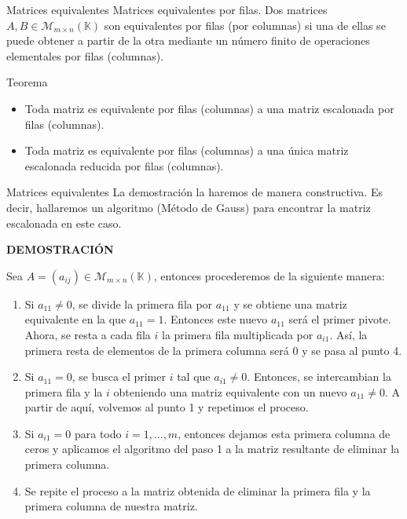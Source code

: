\documentclass[
  ignorenonframetext,
]{beamer}
\providecommand{\tightlist}{%
  \setlength{\itemsep}{0pt}\setlength{\parskip}{0pt}}
\begin{document}
\begin{frame}{Matrices equivalentes}
\protect\hypertarget{matrices-equivalentes}{}
Matrices equivalentes por filas. Dos matrices
\(A,B\in\mathcal{M}_{m\times n}(\mathbb{K})\) son equivalentes por filas
(por columnas) si una de ellas se puede obtener a partir de la otra
mediante un número finito de operaciones elementales por filas
(columnas).

Teorema

\begin{itemize}
\tightlist
\item
  Toda matriz es equivalente por filas (columnas) a una matriz
  escalonada por filas (columnas).
\item
  Toda matriz es equivalente por filas (columnas) a una única matriz
  escalonada reducida por filas (columnas).
\end{itemize}
\end{frame}

\begin{frame}{Matrices equivalentes}
\protect\hypertarget{matrices-equivalentes-1}{}
La demostración la haremos de manera constructiva. Es decir, hallaremos
un algoritmo (Método de Gauss) para encontrar la matriz escalonada en
este caso.

\textbf{DEMOSTRACIÓN}

Sea \(A=(a_{ij})\in\mathcal{M}_{m\times n}(\mathbb{K})\), entonces
procederemos de la siguiente manera:

\begin{enumerate}
\item
  Si \(a_{11}\ne 0\), se divide la primera fila por \(a_{11}\) y se
  obtiene una matriz equivalente en la que \(a_{11}=1\). Entonces este
  nuevo \(a_{11}\) será el primer pivote. Ahora, se resta a cada fila
  \(i\) la primera fila multiplicada por \(a_{i1}\). Así, la primera
  resta de elementos de la primera columna será 0 y se pasa al punto 4.
\item
  Si \(a_{11}=0\), se busca el primer \(i\) tal que \(a_{i1}\ne 0\).
  Entonces, se intercambian la primera fila y la \(i\) obteniendo una
  matriz equivalente con un nuevo \(a_{11}\ne 0\). A partir de aquí,
  volvemos al punto 1 y repetimos el proceso.
\item
  Si \(a_{i1}=0\) para todo \(i=1,\dots,m\), entonces dejamos esta
  primera columna de ceros y aplicamos el algoritmo del paso 1 a la
  matriz resultante de eliminar la primera columna.
\item
  Se repite el proceso a la matriz obtenida de eliminar la primera fila
  y la primera columna de nuestra matriz.
\end{enumerate}
\end{frame}
\end{document}
